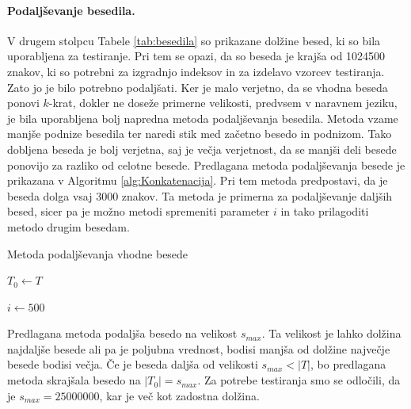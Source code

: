 \paragraph{Podaljševanje besedila.}

V drugem stolpcu Tabele \ref{tab:besedila} so prikazane dolžine besed, ki so bila uporabljena za testiranje. Pri tem se opazi, da so beseda \NK je krajša od 1024500 znakov, ki so potrebni za izgradnjo indeksov in za izdelavo vzorcev testiranja. Zato jo je bilo potrebno podaljšati. Ker je malo verjetno, da se vhodna beseda ponovi $k$-krat, dokler ne doseže primerne velikosti, predvsem v naravnem jeziku, je bila uporabljena bolj napredna metoda podaljševanja besedila. Metoda vzame manjše podnize besedila ter naredi stik med začetno besedo in podnizom. Tako dobljena beseda je bolj verjetna, saj je večja verjetnost, da se manjši deli besede ponovijo za razliko od celotne besede. Predlagana metoda podaljševanja besede je prikazana v Algoritmu \ref{alg:Konkatenacija}. Pri tem metoda predpostavi, da je beseda dolga vsaj $3000$ znakov. Ta metoda je primerna za podaljševanje daljših besed, sicer pa je možno metodi spremeniti parameter $i$ in tako prilagoditi metodo drugim besedam.


\begin{algorithm}[htb]

\caption{Metoda podaljševanja vhodne besede}\label{alg:Konkatenacija}
{
    {$T_0\leftarrow T$}

    {$i\leftarrow 500$}
    
    
}
\end{algorithm}

Predlagana metoda podaljša besedo na velikost $s_{max}$. Ta velikost je lahko dolžina najdaljše besede ali pa je poljubna vrednost, bodisi manjša od dolžine največje besede bodisi večja. Če je beseda daljša od velikosti $s_{max}<|T|$, bo predlagana metoda skrajšala besedo na $|T_0|=s_{max}$. Za potrebe testiranja smo se odločili, da je $s_{max}=25000000$, kar je več kot zadostna dolžina.

